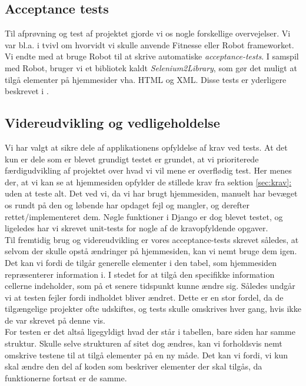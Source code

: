 \documentclass[12pt]{article}
\begin{document}
\subsection{Acceptance tests}
Til afprøvning og test af projektet gjorde vi os nogle forskellige overvejelser. Vi var bl.a. i tvivl om hvorvidt vi skulle anvende Fitnesse eller Robot frameworket. Vi endte med at bruge Robot til at skrive automatiske \textit{acceptance-tests}. I samspil med Robot, bruger vi et bibliotek kaldt \textit{Selenium2Library}, som gør det muligt at tilgå elementer på hjemmesider vha. HTML og XML.
Disse tests er yderligere beskrevet i .

\subsection{Videreudvikling og vedligeholdelse}
Vi har valgt at sikre dele af applikationens opfyldelse af krav ved tests. At det kun er dele som er blevet grundigt testet er grundet, at vi prioriterede færdigudvikling af projektet over hvad vi vil mene er overflødig test. Her menes der, at vi kan se at hjemmesiden opfylder de stillede krav fra sektion \hyperref[sec:krav]{\ref*{sec:krav}: }uden at teste alt. Det ved vi, da vi har brugt hjemmesiden, manuelt har bevæget os rundt på den og løbende har opdaget fejl og mangler, og derefter rettet/implementeret dem. Nøgle funktioner i Django er dog blevet testet, og ligeledes har vi skrevet unit-tests for nogle af de kravopfyldende opgaver. \\
Til fremtidig brug og videreudvikling er vores acceptance-tests skrevet således, at selvom der skulle opstå ændringer på hjemmesiden, kan vi nemt bruge dem igen. Det kan vi fordi de tilgår generelle elementer i den tabel, som hjemmesiden repræsenterer information i. I stedet for at tilgå den specifikke information cellerne indeholder, som på et senere tidspunkt kunne ændre sig. Således undgår vi at testen fejler fordi indholdet bliver ændret. Dette er en stor fordel, da de tilgængelige projekter ofte udskiftes, og tests skulle omskrives hver gang, hvis ikke de var skrevet på denne vis. \\
For testen er det altså ligegyldigt hvad der står i tabellen, bare siden har samme struktur. Skulle selve strukturen af sitet dog ændres, kan vi forholdsvis nemt omskrive testene til at tilgå elementer på en ny måde. Det kan vi fordi, vi kun skal ændre den del af koden som beskriver elementer der skal tilgås, da funktionerne fortsat er de samme. \\
\end{document}
